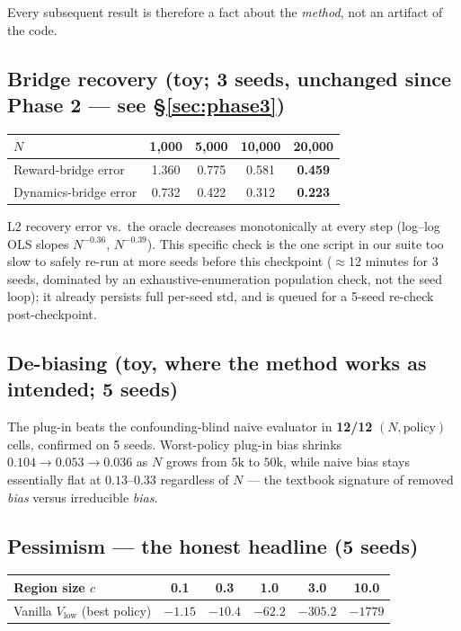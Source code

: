 \documentclass[11pt]{article}
\begin{document}
\noindent Every subsequent result is therefore a fact about the \emph{method}, not an
artifact of the code.

\subsection{Bridge recovery (toy; 3 seeds, unchanged since Phase 2 --- see \S\ref{sec:phase3})}

\begin{center}
\begin{tabular}{@{}lcccc@{}}
\toprule
$N$ & 1,000 & 5,000 & 10,000 & 20,000 \\
\midrule
Reward-bridge error & 1.360 & 0.775 & 0.581 & \textbf{0.459} \\
Dynamics-bridge error & 0.732 & 0.422 & 0.312 & \textbf{0.223} \\
\bottomrule
\end{tabular}
\end{center}

\noindent L2 recovery error vs.\ the oracle decreases monotonically at every step
(log--log OLS slopes $N^{-0.36}$, $N^{-0.39}$). This specific check is the one script in
our suite too slow to safely re-run at more seeds before this checkpoint ($\approx$12 minutes for
3 seeds, dominated by an exhaustive-enumeration population check, not the seed loop); it
already persists full per-seed std, and is queued for a 5-seed re-check post-checkpoint.

\subsection{De-biasing (toy, where the method works as intended; 5 seeds)}

The plug-in beats the confounding-blind naive evaluator in \textbf{12/12}
$(N,\text{policy})$ cells, confirmed on 5 seeds. Worst-policy plug-in bias shrinks
$0.104 \to 0.053 \to 0.036$ as $N$ grows from $5\mathrm{k}$ to $50\mathrm{k}$, while naive
bias stays essentially flat at $0.13$--$0.33$ regardless of $N$ --- the textbook signature
of removed \emph{bias} versus irreducible \emph{bias}.

\subsection{Pessimism --- the honest headline (5 seeds)}

\begin{center}
\begin{tabular}{@{}lccccc@{}}
\toprule
Region size $c$ & 0.1 & 0.3 & 1.0 & 3.0 & 10.0 \\
\midrule
Vanilla $V_{\mathrm{low}}$ (best policy) & $-1.15$ & $-10.4$ & $-62.2$ & $-305.2$ &
\textbf{$-1779$} \\
\bottomrule
\end{tabular}
\end{center}
\end{document}
